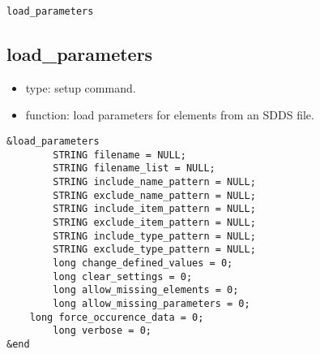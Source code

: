 \documentclass[11pt]{article}
\begin{document}
\begin{latexonly}
\newpage
\begin{center}{\Large\verb|load_parameters|}\end{center}
\end{latexonly}
\subsection{load\_parameters \label{subsec:loadparameters}}

\begin{itemize}
\item type: setup command.
\item function: load parameters for elements from an SDDS file.
\end{itemize}

\begin{verbatim}
&load_parameters
        STRING filename = NULL;
        STRING filename_list = NULL;
        STRING include_name_pattern = NULL;
        STRING exclude_name_pattern = NULL;
        STRING include_item_pattern = NULL;
        STRING exclude_item_pattern = NULL;
        STRING include_type_pattern = NULL;
        STRING exclude_type_pattern = NULL;
        long change_defined_values = 0;
        long clear_settings = 0;
        long allow_missing_elements = 0;
        long allow_missing_parameters = 0;
	long force_occurence_data = 0;
        long verbose = 0;
&end
\end{verbatim}
\end{document}
